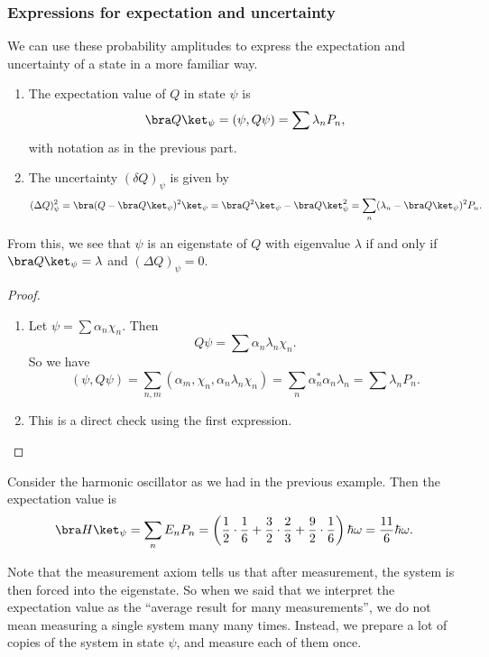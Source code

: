 \documentclass[a4paper]{article}
\begin{document}
\subsubsection*{Expressions for expectation and uncertainty}
We can use these probability amplitudes to express the expectation and uncertainty of a state in a more familiar way.
\begin{prop}\leavevmode
  \begin{enumerate}
    \item The expectation value of $Q$ in state $\psi$ is
      \[
        \bra Q\ket_\psi = (\psi, Q\psi) = \sum \lambda_n P_n,
      \]
      with notation as in the previous part.
    \item The uncertainty $(\delta Q)_\psi$ is given by
      \[
        (\Delta Q)^2_\psi = \bra (Q - \bra Q\ket_\psi)^2\ket_\psi = \bra Q^2\ket_\psi - \bra Q\ket_\psi^2 = \sum_n (\lambda_n - \bra Q\ket_\psi)^2 P_n.
      \]
  \end{enumerate}
\end{prop}
From this, we see that $\psi$ is an eigenstate of $Q$ with eigenvalue $\lambda$ if and only if $\bra Q\ket_\psi = \lambda$ and $(\Delta Q)_\psi = 0$.

\begin{proof}\leavevmode
  \begin{enumerate}
    \item Let $\psi = \sum \alpha_n \chi_n$. Then
      \[
        Q \psi = \sum \alpha_n \lambda_n \chi_n.
      \]
      So we have
      \[
        (\psi, Q\psi) = \sum_{n, m}(\alpha_m, \chi_n, \alpha_n \lambda_n \chi_n) = \sum_n \alpha_n^* \alpha_n \lambda_n = \sum \lambda_n P_n.
      \]
    \item This is a direct check using the first expression.\qedhere
  \end{enumerate}
\end{proof}

\begin{eg}
  Consider the harmonic oscillator as we had in the previous example. Then the expectation value is
  \[
    \bra H\ket_\psi = \sum_n E_n P_n = \left(\frac{1}{2} \cdot \frac{1}{6} + \frac{3}{2} \cdot \frac{2}{3} + \frac{9}{2}\cdot \frac{1}{6}\right)\hbar \omega = \frac{11}{6}\hbar \omega.
  \]
\end{eg}
Note that the measurement axiom tells us that after measurement, the system is then forced into the eigenstate. So when we said that we interpret the expectation value as the ``average result for many measurements'', we do not mean measuring a single system many many times. Instead, we prepare a lot of copies of the system in state $\psi$, and measure each of them once.
\end{document}
